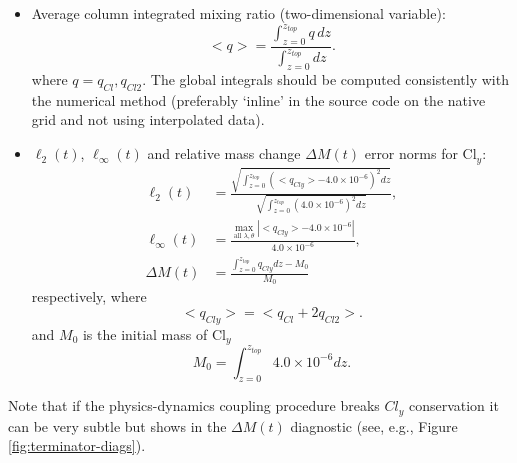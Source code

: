 \documentclass[times,doublespace]{fldauth}
\begin{document}
\begin{itemize}
\item Average column integrated mixing ratio (two-dimensional variable):
\begin{equation}
<q>=\frac{\int_{z=0}^{z_{top}} q\, dz}{\int_{z=0}^{z_{top}} dz}.
\end{equation}
where $q=q_{Cl},q_{Cl2}$. The global integrals should be computed consistently with the numerical method (preferably `inline' in the source code on the native grid and not using interpolated data).
\item $\ell_2(t)$, $\ell_\infty(t)$ and relative mass change $\Delta M(t)$ error norms for Cl$_y$:
\begin{align}
\ell_2(t)&=\frac{\sqrt{\int_{z=0}^{z_{top}}\left(<q_{Cly}>-4.0\times 10^{-6}\right)^2 dz}}{\sqrt{\int_{z=0}^{z_{top}}\left(4.0\times 10^{-6}\right)^2 dz}},\\
\ell_\infty(t)&=\frac{\max_{\text{all }\lambda, \theta} |<q_{Cly}>-4.0\times 10^{-6}|}{4.0\times 10^{-6}},\\
\Delta M(t)&=\frac{\int_{z=0}^{z_{top}}q_{Cly}dz-M_0}{M_0}
\end{align}
respectively, where
\begin{equation}
<q_{Cly}>=<q_{Cl}+2q_{Cl2}>.
\end{equation}
and $M_0$ is the initial mass of Cl$_y$
\begin{equation}
M_0=\int_{z=0}^{z_{top}}4.0\times 10^{-6}dz.
\end{equation}
\end{itemize}
Note that if the physics-dynamics coupling procedure breaks $Cl_y$ conservation it can be very subtle but shows in the $\Delta M(t)$ diagnostic (see, e.g., Figure \ref{fig:terminator-diags}).
\end{document}
